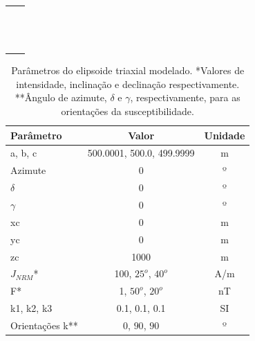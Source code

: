 \begin{table}[h!]
	\begin{center}
		\begin{tabular}{lc}
			
			&  \\
			& \\
			& \\
			& \\
			& \\
			& \\
			& \\
			& \\
			& \\
			& \\
			& \\
			& \\
			& \\
		\end{tabular}
	\end{center}
\end{table}

\begin{table}[h!]
	\begin{center}
		\begin{tabular}{|l|c|c|}
			\hline
			\textbf{Parâmetro}  & \textbf{Valor}  & \textbf{Unidade}\\
			\hline 
			a, b, c   & 500.0001, 500.0, 499.9999   & m\\
			\hline
			Azimute   & $0$ & º\\
			\hline
			$\delta$    & $0$ & º\\
			\hline
			$\gamma$   & $0$  & º\\
			\hline
			xc   & 0  & m\\
			\hline          
			yc   & 0  & m\\
			\hline                
			zc   & 1000  & m\\
			\hline
			$J_{NRM}$*  & 100, $25^o$, $40^o$  & A/m\\
			\hline
			F*    & 1, $50^o$, $20^o$ & nT\\
			\hline
			k1, k2, k3   & 0.1, 0.1, 0.1 & SI \\
			\hline
			Orientações k**   & $0$, $90$, $90$  & º\\
			\hline
		\end{tabular}
		\caption{Parâmetros do elipsoide triaxial modelado. *Valores de intensidade, inclinação e declinação respectivamente. **Ângulo de azimute, $\delta$ e $\gamma$, respectivamente, para as orientações da susceptibilidade.}
	\end{center}
	\label{tab:triaxial_sphere}
\end{table}

